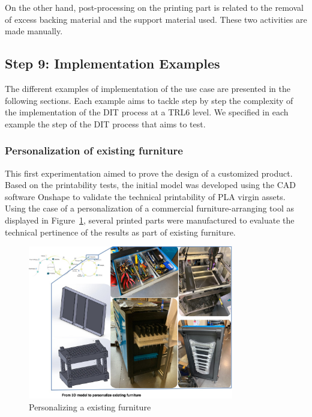 \documentclass[
  11pt,
]{article}
\begin{document}
On the other hand, post-processing on the printing part is related to
the removal of excess backing material and the support material used.
These two activities are made manually.

\hypertarget{step-9-implementation-examples}{%
\subsection{Step 9: Implementation
Examples}\label{step-9-implementation-examples}}

The different examples of implementation of the use case are presented
in the following sections. Each example aims to tackle step by step the
complexity of the implementation of the DIT process at a TRL6 level. We
specified in each example the step of the DIT process that aims to test.

\hypertarget{personalization-of-existing-furniture}{%
\subsubsection{Personalization of existing
furniture}\label{personalization-of-existing-furniture}}

This first experimentation aimed to prove the design of a customized
product. Based on the printability tests, the initial model was
developed using the CAD software Onshape to validate the technical
printability of PLA virgin assets. Using the case of a personalization
of a commercial furniture-arranging tool as displayed in
Figure~\ref{fig-demo1}, several printed parts were manufactured to
evaluate the technical pertinence of the results as part of existing
furniture.

\begin{figure}[H]

{\centering \includegraphics[width=0.8\textwidth,height=\textheight]{figures/Demo-01.jpg}

}

\caption{\label{fig-demo1}Personalizing a existing furniture}

\end{figure}
\end{document}
